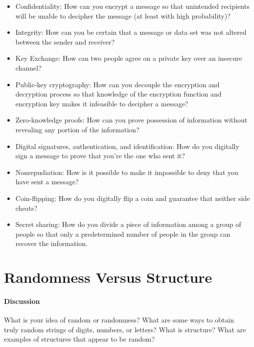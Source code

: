 	\begin{itemize}
		\item Confidentiality: How can you encrypt a message so that unintended recipients will be unable to decipher the message (at least with high probability)?
		\item Integrity: How can you be certain that a message or data set was not altered between the sender and receiver?
		\item Key Exchange: How can two people agree on a private key over an insecure channel?
		\item Public-key cryptography: How can you decouple the encryption and decryption process so that knowledge of the encryption function and encryption key makes it infeasible to decipher a message?
		\item Zero-knowledge proofs: How can you prove possession of information without revealing any portion of the information?
		\item Digital signatures, authentication, and identification: How do you digitally sign a message to prove that you're the one who sent it?
		\item Nonrepudiation: How is it possible to make it impossible to deny that you have sent a message?
		\item Coin-flipping: How do you digitally flip a coin and guarantee that neither side cheats?
		\item Secret sharing: How do you divide a piece of information among a group of people so that only a predetermined number of people in the group can recover the information.

	\end{itemize}

	\section{Randomness Versus Structure}

\paragraph*{Discussion} What is your idea of random or randomness? What are some ways to obtain truly random strings of digits, numbers, or letters? What is structure? What are examples of structures that appear to be random?


